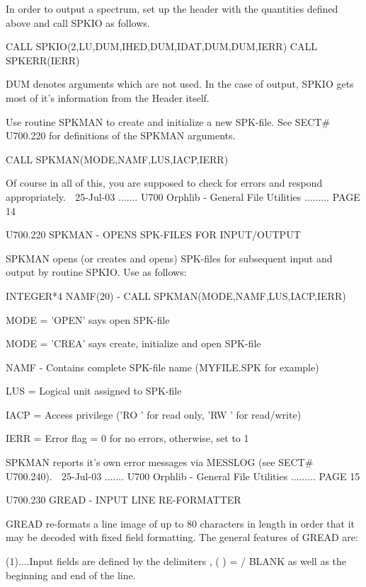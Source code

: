    In  order  to  output  a  spectrum,  set  up the header with the quantities
   defined above and call SPKIO as follows.
 
         CALL SPKIO(2,LU,DUM,IHED,DUM,IDAT,DUM,DUM,IERR)
         CALL SPKERR(IERR)
 
   DUM denotes arguments which are not used. In  the  case  of  output,  SPKIO
   gets most of it's information from the Header itself.
 
   Use  routine  SPKMAN  to  create  and  initialize a new SPK-file. See SECT#
   U700.220 for definitions of the SPKMAN arguments.
 
         CALL SPKMAN(MODE,NAMF,LUS,IACP,IERR)
 
   Of course in all of this, you are supposed to check for errors and  respond
   appropriately.
    
   25-Jul-03 ....... U700  Orphlib - General File Utilities ......... PAGE  14
 
 
   U700.220  SPKMAN   - OPENS SPK-FILES FOR INPUT/OUTPUT
 
   SPKMAN  opens  (or  creates  and  opens) SPK-files for subsequent input and
   output by routine SPKIO. Use as follows:
 
          INTEGER*4 NAMF(20)
             -
          CALL SPKMAN(MODE,NAMF,LUS,IACP,IERR)
 
   MODE = 'OPEN' says open  SPK-file
 
   MODE = 'CREA' says create, initialize and open SPK-file
 
   NAMF - Contains complete SPK-file name (MYFILE.SPK for example)
 
   LUS  = Logical unit assigned to SPK-file
 
   IACP = Access privilege ('RO  ' for read only, 'RW  ' for read/write)
 
   IERR = Error flag = 0 for no errors, otherwise, set to 1
 
   SPKMAN reports it's own error messages via MESSLOG (see SECT# U700.240).
    
   25-Jul-03 ....... U700  Orphlib - General File Utilities ......... PAGE  15
 
 
   U700.230  GREAD    - INPUT LINE RE-FORMATTER
 
   GREAD re-formats a line image of up to 80 characters  in  length  in  order
   that  it  may  be decoded with fixed field formatting. The general features
   of GREAD are:
 
   (1)....Input fields are defined by the delimiters , ( ) = / BLANK  as  well
          as the beginning and end of the line.
 
